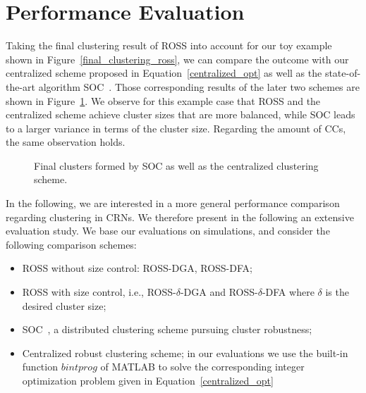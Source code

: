 \documentclass[times]{ettauth}
\newcommand{\ie}{i.e., }
\theoremstyle{mytheoremstyle}
\theoremstyle{mytheoremstyle}
\theoremstyle{mytheoremstyle}
\begin{document}
\section{Performance Evaluation}
\label{performance}
Taking the final clustering result of ROSS into account for our toy example shown in Figure~\ref{final_clustering_ross}, we can compare the outcome with our centralized scheme proposed in Equation~\ref{centralized_opt} as well as the state-of-the-art algorithm SOC~\cite{LIU_TMC11_2}.
Those corresponding results of the later two schemes are shown in Figure~\ref{fig:final_clustering}.
We observe for this example case that ROSS and the centralized scheme achieve cluster sizes that are more balanced, while SOC leads to a larger variance in terms of the cluster size.
Regarding the amount of CCs, the same observation holds. 
\begin{figure}[ht]
\begin{center}
\hspace{0.15 in}
\end{center}
\caption{Final clusters formed by SOC as well as the centralized clustering scheme.}
\label{fig:final_clustering}
\end{figure}

In the following, we are interested in a more general performance comparison regarding clustering in CRNs.
We therefore present in the following an extensive evaluation study.
We base our evaluations on simulations, and consider the following comparison schemes:
\begin{itemize}
\item ROSS without size control: ROSS-DGA, ROSS-DFA;
\item ROSS with size control, \ie ROSS-$\delta$-DGA and ROSS-$\delta$-DFA where $\delta$ is the desired cluster size;
\item SOC~\cite{LIU_TMC11_2}, a distributed clustering scheme pursuing cluster robustness;
\item Centralized robust clustering scheme; in our evaluations we use the built-in function $bintprog$ of MATLAB to solve the corresponding integer optimization problem given in Equation~\ref{centralized_opt}
\end{itemize}
\end{document}
